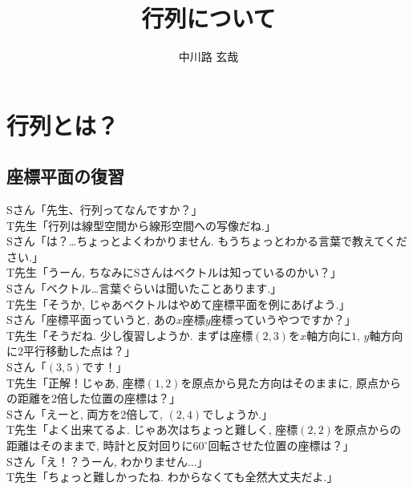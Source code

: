 \documentclass[a4paper,12pt]{jreport}
\title{行列について}
\author{中川路 玄哉}
\theoremstyle{definition}
\newcommand{\ang}[1]{#1^\circ}
\begin{document}
   \maketitle
   \tableofcontents
   \chapter{行列とは？}
   \section{座標平面の復習}
   Sさん「先生、行列ってなんですか？」\\

   T先生「行列は線型空間から線形空間への写像だね.」\\
   
   Sさん「は？…ちょっとよくわかりません. もうちょっとわかる言葉で教えてください.」\\

   T先生「うーん, ちなみにSさんはベクトルは知っているのかい？」\\

   Sさん「ベクトル…言葉ぐらいは聞いたことあります.」\\

   T先生「そうか, じゃあベクトルはやめて座標平面を例にあげよう.」\\

   Sさん「座標平面っていうと, あの$x$座標$y$座標っていうやつですか？」\\

   T先生「そうだね. 少し復習しようか. まずは座標$(2, 3)$を$x$軸方向に$1$, $y$軸方向に$2$平行移動した点は？」\\

   Sさん「$(3, 5)$です！」\\

   T先生「正解！じゃあ, 座標$(1, 2)$を原点から見た方向はそのままに, 原点からの距離を2倍した位置の座標は？」\\

   Sさん「えーと, 両方を2倍して, $(2, 4)$でしょうか.」\\

   T先生「よく出来てるよ. じゃあ次はちょっと難しく, 座標$(2,2)$を原点からの距離はそのままで, 時計と反対回りに$\ang{60}$回転させた位置の座標は？」\\

   Sさん「え！？うーん, わかりません...」\\

   T先生「ちょっと難しかったね. わからなくても全然大丈夫だよ.」\\
\end{document}
